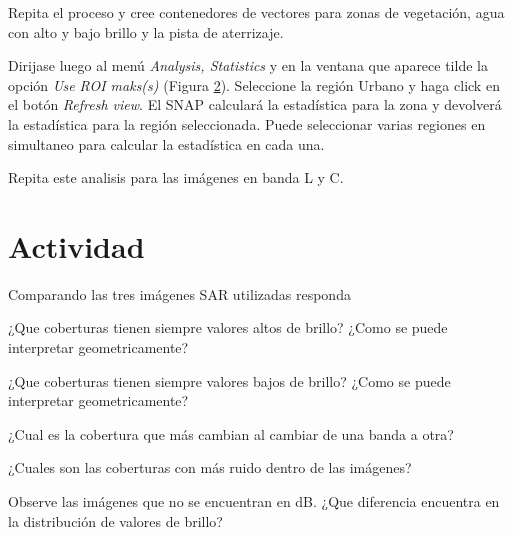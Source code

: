 \begin{figure}[h!]
    \centering
    \caption{}
    \label{fig:vector-cont}
\end{figure}

Repita el proceso y cree contenedores de vectores para zonas de vegetación, agua con alto y bajo brillo y la pista de aterrizaje.

Dirijase luego al menú \emph{Analysis, Statistics} y en la ventana que aparece tilde la opción \emph{Use ROI maks(s)} (Figura \ref{fig:estadistica}). Seleccione la región Urbano y haga click en el botón \emph{Refresh view}. El SNAP calculará la estadística para la zona y devolverá la estadística para la región seleccionada. Puede seleccionar varias regiones en simultaneo para calcular la estadística en cada una.

\begin{figure}[h!]
    \centering
    \caption{}
    \label{fig:estadistica}
\end{figure}

Repita este analisis para las imágenes en banda L y C.

\section{Actividad}

Comparando las tres imágenes SAR utilizadas responda

\begin{que}
    ¿Que coberturas tienen siempre valores altos de brillo? ¿Como se puede interpretar geometricamente?
\end{que}

\begin{que}
    ¿Que coberturas tienen siempre valores bajos de brillo? ¿Como se puede interpretar geometricamente?
\end{que}

\begin{que}
    ¿Cual es la cobertura que más cambian al cambiar de una banda a otra?
\end{que}

\begin{que}
    ¿Cuales son las coberturas con más ruido dentro de las imágenes?
\end{que}

\begin{que}
    Observe las imágenes que no se encuentran en dB. ¿Que diferencia encuentra en la distribución de valores de brillo?
\end{que}
